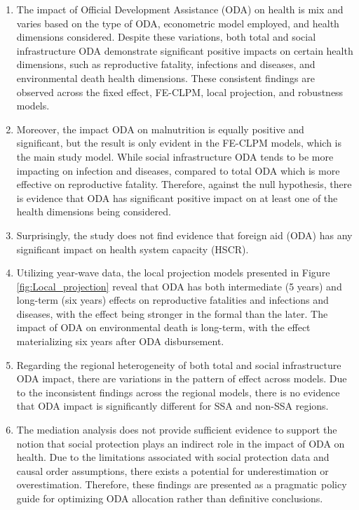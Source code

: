 \begin{enumerate}[i]
    \item The impact of Official Development Assistance (ODA) on health is mix and varies based on the type of ODA, econometric model employed, and health dimensions considered. Despite these variations, both total and social infrastructure ODA demonstrate significant positive impacts on certain health dimensions, such as reproductive fatality, infections and diseases, and environmental death health dimensions. These consistent findings are observed across the fixed effect, FE-CLPM, local projection, and robustness models. 
    \item Moreover, the impact ODA on malnutrition is equally positive and significant, but the result is only evident in the FE-CLPM models, which is the main study model. While social infrastructure ODA tends to be more impacting on infection and diseases, compared to total ODA which is more effective on reproductive fatality. Therefore, against the null hypothesis, there is evidence that ODA has significant positive impact on at least one of the health dimensions being considered.
    \item Surprisingly, the study does not find evidence that foreign aid (ODA) has any significant impact on health system capacity (HSCR).

    \item Utilizing year-wave data, the local projection models presented in Figure \ref{fig:Local_projection} reveal that ODA has both intermediate (5 years) and long-term (six years) effects on reproductive fatalities and infections and diseases, with the effect being stronger in the formal than the later. The impact of ODA on environmental death is long-term, with the effect materializing six years after ODA disbursement. 

    \item Regarding the regional heterogeneity of both total and social infrastructure ODA impact, there are variations in the pattern of effect across models. Due to the inconsistent findings across the regional models, there is no evidence that ODA impact is significantly different for SSA and non-SSA regions.  
    

    \item The mediation analysis does not provide sufficient evidence to support the notion that social protection plays an indirect role in the impact of ODA on health. Due to the limitations associated with social protection data and causal order assumptions, there exists a potential for underestimation or overestimation. Therefore, these findings are presented as a pragmatic policy guide for optimizing ODA allocation rather than definitive conclusions.
\end{enumerate}

